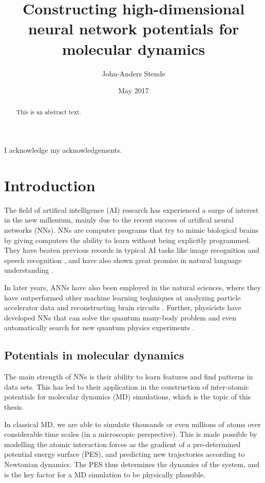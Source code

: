 \documentclass[twoside,english]{uiofysmaster}
\author{John-Anders Stende}
\title{Constructing high-dimensional neural network potentials for molecular dynamics}
\date{May 2017}
\begin{document}
\maketitle

\begin{abstract}
This is an abstract text.
\end{abstract}

\begin{acknowledgements}
  I acknowledge my acknowledgements.
\end{acknowledgements}

\tableofcontents

\chapter{Introduction}
The field of artifical intelligence (AI) research has experienced a surge of interest in 
the new millenium, mainly due to the recent success of artifical neural networks (NNs). 
NNs are computer programs that try to mimic biological brains
by giving computers the ability to learn without being explicitly programmed. 
They have beaten previous records in typical AI tasks like image recognition \cite{Krizhevsky12} and speech recognition
\cite{Hinton12}, and have also shown great promise in natural language understanding \cite{Collobert11}. 
 
In later years, ANNs have also been employed in the natural sciences, where they have outperformed other machine learning
teqhniques at analyzing particle accelerator data \cite{Ciodaro12} and reconstructing brain circuits
\cite{Helmstaedter13}. Further, physicists have developed NNs that can solve the quantum many-body problem
\cite{Carleo17} and even automatically search for new quantum physics experiments \cite{Krenn16}. 

\section{Potentials in molecular dynamics}
The main strength of NNs is their ability to learn features and find patterns in data sets. 
This has led to their application in the construction of inter-atomic potentials for molecular dynamics (MD) simulations, 
which is the topic of this thesis.

In classical MD, we are able to simulate thousands or even millions of atoms over considerable 
time scales (in a microscopic perspective). This is made possible by modelling the atomic interaction forces 
as the gradient of a pre-determined potential energy surface (PES), and predicting new trajectories according 
to Newtonian dynamics. The PES thus determines the dynamics of the system, and is the 
key factor for a MD simulation to be physically plausible.
\end{document}
